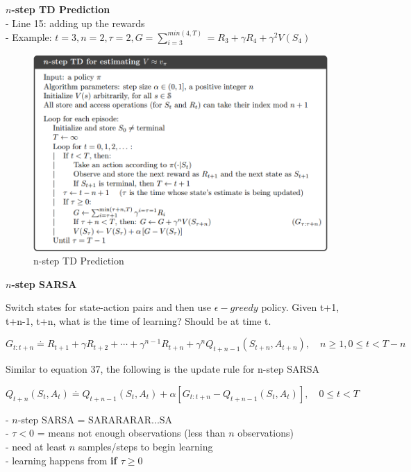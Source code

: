 \documentclass{article}
\begin{document}
\noindent
\textbf{$n$-step TD Prediction}\\
- Line 15: adding up the rewards\\
- Example: $t = 3, n = 2, \tau = 2, G = \sum_{i=3}^{min(4, T)} = R_{3} + \gamma R_{4} + \gamma^{2} V(S_{4})$
\begin{figure}[h]
\includegraphics[scale=0.4]{nstep_td}
\centering
\caption{n-step TD Prediction}
\end{figure}

\newpage
\noindent
\textbf{$n$-step SARSA}

\noindent
Switch states for state-action pairs and then use $\epsilon - greedy$ policy.
Given t+1, t+n-1, t+n, what is the time of learning? Should be at time t.

\begin{equation}
G_{t: t+n} \doteq R_{t+1}+\gamma R_{t+2}+\cdots+\gamma^{n-1} R_{t+n}+\gamma^{n} Q_{t+n-1}\left(S_{t+n}, A_{t+n}\right), \quad n \geq 1,0 \leq t<T-n
\end{equation}

\noindent
Similar to equation 37, the following is the update rule for n-step SARSA

\begin{equation}
Q_{t+n}\left(S_{t}, A_{t}\right) \doteq Q_{t+n-1}\left(S_{t}, A_{t}\right)+\alpha\left[G_{t: t+n}-Q_{t+n-1}\left(S_{t}, A_{t}\right)\right], \quad 0 \leq t<T
\end{equation}

\noindent
- $n$-step SARSA = SARARARAR...SA\\
- $\tau < 0$ = means not enough observations (less than $n$ observations)\\
- need at least $n$ samples/steps to begin learning\\
- learning happens from \textbf{if $\tau \geq 0$}
\end{document}
